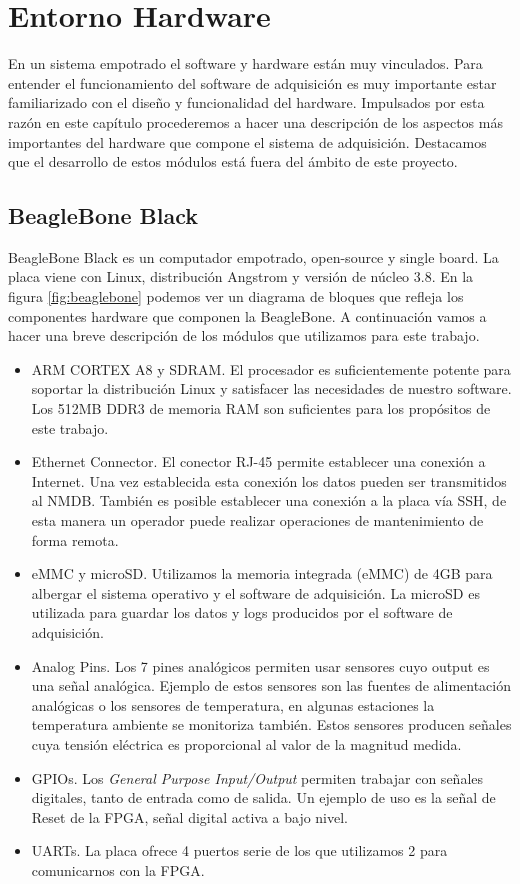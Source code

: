 \chapter{Entorno Hardware}
\label{entornoHW}

En un sistema empotrado el software y hardware están muy vinculados. Para entender el funcionamiento del software de adquisición es muy importante
estar familiarizado con el diseño y funcionalidad del hardware. Impulsados por esta razón en este capítulo procederemos a hacer una descripción de los
aspectos más importantes del hardware que compone el sistema de adquisición. Destacamos que el desarrollo de estos módulos está fuera del ámbito de
este proyecto.
\section{BeagleBone Black}
	BeagleBone Black\cite{Beagle}\cite{BeagleWiki} es un computador empotrado, open-source y single board. La placa viene con Linux, distribución
	Angstrom y versión de núcleo 3.8. En la figura \ref{fig:beaglebone} podemos ver un diagrama de bloques que refleja los componentes hardware
	que componen la BeagleBone. A continuación vamos a hacer una breve descripción de los módulos que utilizamos para este trabajo.
	\begin{itemize}
		\item 	ARM CORTEX A8\cite{BeagleCore} y SDRAM. El procesador es suficientemente potente para soportar la distribución Linux y
			satisfacer las necesidades de nuestro software. Los 512MB DDR3 de memoria RAM son suficientes para los propósitos de este
			trabajo.
		\item 	Ethernet Connector. El conector RJ-45 permite establecer una conexión a Internet. Una vez establecida esta conexión los datos
			pueden ser transmitidos al NMDB. También es posible establecer una conexión a la placa vía SSH, de esta manera un operador
			puede realizar operaciones de mantenimiento de forma remota.
		\item	eMMC y microSD. Utilizamos la memoria integrada (eMMC) de 4GB para albergar el sistema operativo y el software de
			adquisición. La microSD es utilizada para guardar los datos y logs producidos por el software de adquisición.
		\item 	Analog Pins. Los 7 pines analógicos permiten usar sensores cuyo output es una señal analógica. Ejemplo de estos sensores son
			las fuentes de alimentación analógicas o los sensores de temperatura, en algunas estaciones la temperatura ambiente se
			monitoriza también. Estos sensores producen señales cuya tensión eléctrica es proporcional al valor de la magnitud medida. 
		\item 	GPIOs. Los \emph{General Purpose Input/Output} permiten trabajar con señales digitales, tanto de entrada como de salida. Un
			ejemplo de uso es la señal de Reset de la FPGA, señal digital activa a bajo nivel.
		\item	UARTs. La placa ofrece 4 puertos serie de los que utilizamos 2 para comunicarnos con la FPGA.
	\end{itemize}
